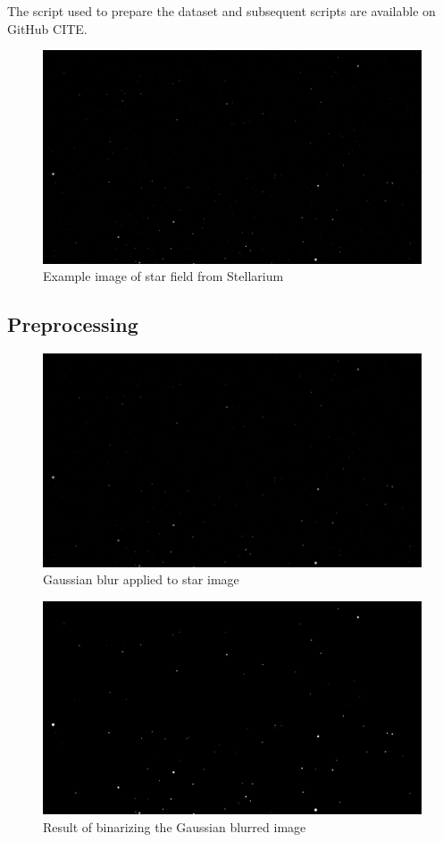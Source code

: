 \documentclass[10pt,twocolumn,letterpaper]{article}
\begin{document}
The script used to prepare the dataset and subsequent scripts are available on GitHub CITE.

\begin{figure}[H]
  \centering
   \includegraphics[width=0.9\linewidth]{stars_000}
   \caption{Example image of star field from Stellarium}
   \label{fig:star_img}
\end{figure}

\subsection{Preprocessing}

\begin{figure}[H]
  \centering
   \includegraphics[width=0.9\linewidth]{gauss}
   \caption{Gaussian blur applied to star image}
   \label{fig:star_gauss}
\end{figure}

\begin{figure}[H]
  \centering
   \includegraphics[width=0.9\linewidth]{binary}
   \caption{Result of binarizing the Gaussian blurred image}
   \label{fig:star_binary}
\end{figure}
\end{document}
